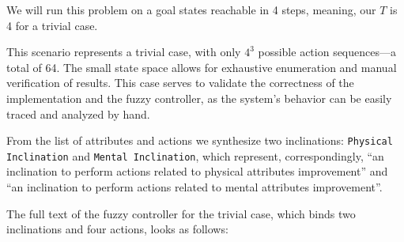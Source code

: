 \documentclass[12pt, a4paper]{report}
\begin{document}
	We will run this problem on a goal states reachable in 4 steps, meaning, our $T$ is 4 for a trivial case.

	This scenario represents a trivial case, with only $4^{3}$ possible action sequences—a total of 64.
	The small state space allows for exhaustive enumeration and manual verification of results.
	This case serves to validate the correctness of the implementation and the fuzzy controller, as the system's behavior can be easily traced and analyzed by hand.

	From the list of attributes and actions we synthesize two inclinations: \texttt{Physical Inclination} and \texttt{Mental Inclination}, which represent, correspondingly, ``an inclination to perform actions related to physical attributes improvement'' and ``an inclination to perform actions related to mental attributes improvement''.
	
	The full text of the fuzzy controller for the trivial case, which binds two inclinations and four actions, looks as follows:
	
\end{document}
